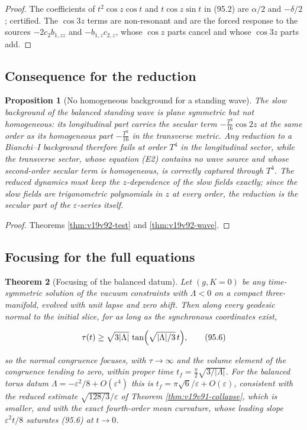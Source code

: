 \documentclass[11pt]{article}
\newtheorem{theorem}{Theorem}[section]
\newtheorem{proposition}[theorem]{Proposition}
\theoremstyle{remark}
\begin{document}
\begin{proof}
The coefficients of \(t^2\cos z\cos t\) and \(t\cos z\sin t\) in
(95.2) are \(\alpha/2\) and \(-\delta/2\); certified.  The
\(\cos3z\) terms are non-resonant and are the forced response to the
sources \(-2c_2b_{1,zz}\) and \(-b_{1,z}c_{2,z}\), whose \(\cos z\)
parts cancel and whose \(\cos3z\) parts add.
\end{proof}

\subsection{Consequence for the reduction}

\begin{proposition}[No homogeneous background for a standing wave]
\label{prop:v19v92-inhomogeneous}
The slow background of the balanced standing wave is plane symmetric
but not homogeneous: its longitudinal part carries the secular term
\(-\tfrac{T^2}{16}\cos2z\) at the same order as its homogeneous part
\(-\tfrac{T^2}{16}\) in the transverse metric.  Any reduction to a
Bianchi--I background therefore fails at order \(T^4\) in the
longitudinal sector, while the transverse sector, whose equation
(E2) contains no wave source and whose second-order secular term is
homogeneous, is correctly captured through \(T^4\).  The reduced
dynamics must keep the \(z\)-dependence of the slow fields exactly;
since the slow fields are trigonometric polynomials in \(z\) at every
order, the reduction is the secular part of the \(\varepsilon\)-series
itself.
\end{proposition}

\begin{proof}
Theorems \ref{thm:v19v92-test} and \ref{thm:v19v92-wave}.
\end{proof}

\subsection{Focusing for the full equations}

\begin{theorem}[Focusing of the balanced datum]
\label{thm:v19v92-focusing}
Let \((g,K=0)\) be any time-symmetric solution of the vacuum
constraints with \(\Lambda<0\) on a compact three-manifold, evolved
with unit lapse and zero shift.  Then along every geodesic normal to
the initial slice, for as long as the synchronous coordinates exist,

\[
 \tau(t)\geq\sqrt{3|\Lambda|}\,\tan\Bigl(\sqrt{|\Lambda|/3}\,t\Bigr),   \tag{95.6}
\]

so the normal congruence focuses, with \(\tau\to\infty\) and the
volume element of the congruence tending to zero, within proper time
\(t_f=\tfrac\pi2\sqrt{3/|\Lambda|}\).  For the balanced torus datum
\(\Lambda=-\varepsilon^2/8+O(\varepsilon^4)\) this is
\(t_f=\pi\sqrt6/\varepsilon+O(\varepsilon)\), consistent with the
reduced estimate \(\sqrt{128/3}/\varepsilon\) of Theorem
\ref{thm:v19v91-collapse}, which is smaller, and with the exact
fourth-order mean curvature, whose leading slope \(\varepsilon^2t/8\)
saturates (95.6) at \(t\to0\).
\end{theorem}
\end{document}
